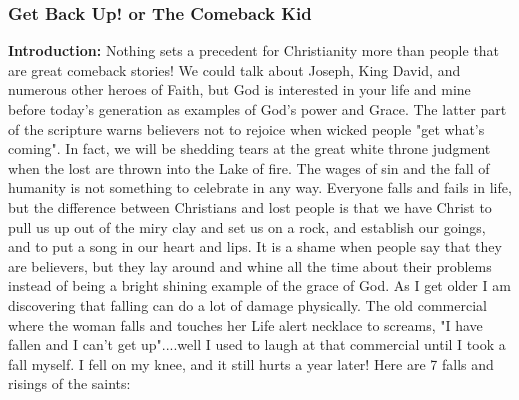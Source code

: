 

\subsubsection{Get Back Up! or The Comeback Kid}
\textbf{Introduction:} Nothing sets a precedent for Christianity more than people that are great comeback stories!  We could talk about Joseph, King David, and numerous other heroes of Faith, but God is interested in your life and mine before today's generation as examples of God's power and Grace. The latter part of the scripture warns believers not to rejoice when wicked people "get what's coming".  In fact, we will be shedding tears at the great white throne judgment when the lost are thrown into the Lake of fire.  The wages of sin and the fall of humanity is not something to celebrate in any way. Everyone falls and fails in life,  but the difference between Christians and lost people is that we have Christ to pull us up out of the miry clay and set us on a rock, and establish our goings, and to put a song in our heart and lips. It is a shame when people say that they are believers, but they lay around and whine all the time about their problems instead of being a bright shining example of the grace of God. As I get older I am discovering that falling can do a lot of damage physically.  The old commercial where the woman falls and touches her Life alert necklace to screams,  "I have fallen and I can't get up"....well I used to laugh at that commercial until I took a fall myself. I fell on my knee, and it still hurts a year later! Here are 7 falls and risings of the saints:\\
